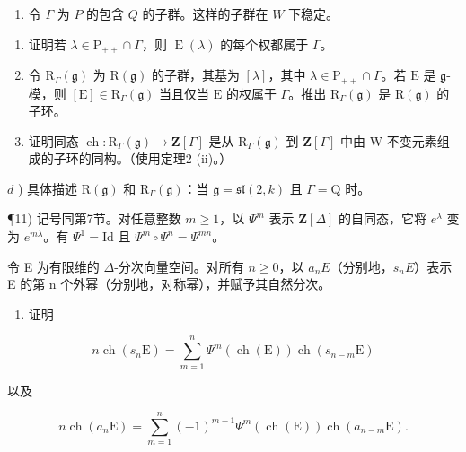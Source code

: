 \begin{enumerate}
\def\labelenumi{\arabic{enumi})}
\setcounter{enumi}{9}
\tightlist
\item
  令 \(\Gamma\) 为 \(P\) 的包含 \(Q\) 的子群。这样的子群在 \(W\) 下稳定。
\end{enumerate}

\begin{enumerate}
\def\labelenumi{\alph{enumi})}
\item
  证明若 \(\lambda \in \mathrm{P}_{++} \cap \Gamma\)，则 \(\operatorname{E}(\lambda)\) 的每个权都属于 \(\Gamma\)。
\item
  令 \(\mathrm{R}_{\Gamma}(\mathfrak{g})\) 为 \(\mathrm{R}(\mathfrak{g})\) 的子群，其基为 \([\lambda]\)，其中 \(\lambda \in \mathrm{P}_{++} \cap \Gamma\)。若 \(\mathrm{E}\) 是 \(\mathfrak{g}\)-模，则 \([\mathrm{E}] \in \mathrm{R}_{\Gamma}(\mathfrak{g})\) 当且仅当 \(\mathrm{E}\) 的权属于 \(\Gamma\)。推出 \(\mathrm{R}_{\Gamma}(\mathfrak{g})\) 是 \(\mathrm{R}(\mathfrak{g})\) 的子环。
\item
  证明同态 \(\operatorname{ch} : \mathrm{R}_{\Gamma}(\mathfrak{g}) \to \mathbf{Z}[\Gamma]\) 是从 \(\mathrm{R}_{\Gamma}(\mathfrak{g})\) 到 \(\mathbf{Z}[\Gamma]\) 中由 W 不变元素组成的子环的同构。（使用定理2 (ii)。）
\end{enumerate}

\(d\) ) 具体描述 \(\mathrm{R}(\mathfrak{g})\) 和 \(\mathrm{R}_{\Gamma}(\mathfrak{g})\)：当 \(\mathfrak{g} = \mathfrak{sl}(2,k)\) 且 \(\Gamma = \mathrm{Q}\) 时。

¶11) 记号同第7节。对任意整数 \(m \geq 1\)，以 \(\Psi^{m}\) 表示 \(\mathbf{Z}[\Delta]\) 的自同态，它将 \(e^{\lambda}\) 变为 \(e^{m\lambda}\)。有 \(\Psi^{1} = \mathrm{Id}\) 且 \(\Psi^{m} \circ \Psi^{n} = \Psi^{mn}\)。

令 E 为有限维的 \(\Delta\)-分次向量空间。对所有 \(n \geq 0\)，以 \(a_{n}E\)（分别地，\(s_{n}E\)）表示 E 的第 n 个外幂（分别地，对称幂），并赋予其自然分次。

\begin{enumerate}
\def\labelenumi{\alph{enumi})}
\tightlist
\item
  证明
\end{enumerate}

\[
n \operatorname{ch} (s _ {n} \mathrm{E}) = \sum_ {m = 1} ^ {n} \Psi^ {m} (\operatorname{ch} (\mathrm{E})) \operatorname{ch} (s _ {n - m} \mathrm{E})
\]

以及

\[
n \operatorname{ch} (a _ {n} \mathrm{E}) = \sum_ {m = 1} ^ {n} (- 1) ^ {m - 1} \varPsi^ {m} (\operatorname{ch} (\mathrm{E})) \operatorname{ch} (a _ {n - m} \mathrm{E}).
\]

